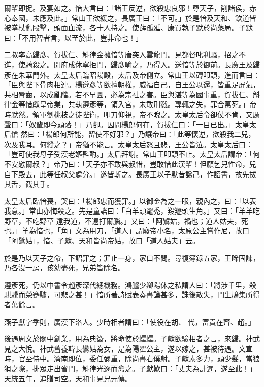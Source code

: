 \begin{pinyinscope}
 爾輩即捉。及宴如之。愔大言曰：「諸王反逆，欲殺忠良邪！尊天子，削諸侯，赤心奉國，未應及此。」常山王欲緩之，長廣王曰：「不可。」於是愔及天和、欽道皆被拳杖亂毆擊，頭面血流，各十人持之。使薛孤延、康買執子默於尚藥局。子默曰：「不用智者言，以至於此，豈非命也！」



 二叔率高歸彥、賀拔仁、斛律金擁愔等唐突入雲龍門。見都督叱利騷，招之不
 進，使騎殺之。開府成休寧拒門，歸彥喻之，乃得入。送愔等於御前。長廣王及歸彥在朱華門外。太皇太后臨昭陽殿，太后及帝側立。常山王以磚叩頭，進而言曰：「臣與陛下骨肉相連。楊遵彥等欲擅朝權，威福自己，自王公以還，皆重足屏氣，共相脣齒，以成亂階。若不早圖，必為宗社之害。臣與湛等為國事重，賀拔仁、斛律金等惜獻皇帝業，共執遵彥等，領入宮，未敢刑戮。專輒之失，罪合萬死。」帝時默然。領軍劉桃枝之徒陛衛，叩刀仰視，帝不睨之。太皇太后令卻仗不肯，又厲聲曰：「奴輩即今頭落！」乃卻。因問楊郎何在，賀拔仁曰：「一目已出。」太皇太后愴
 然曰：「楊郎何所能，留使不好邪？」乃讓帝曰：「此等懷逆，欲殺我二兒，次及我耳。何縱之？」帝猶不能言。太皇太后怒且悲，王公皆泣。太皇太后曰：「豈可使我母子受漢老嫗斟酌。」太后拜謝。常山王叩頭不止。太皇太后謂帝：「何不安慰爾叔？」帝乃曰：「天子亦不敢與叔惜，豈敢惜此漢輩！但願乞兒性命，兒自下殿去，此等任叔父處分。」遂皆斬之。長廣王以子默昔讒己，作詔書，故先拔其舌，截其手。



 太皇太后臨愔喪，哭曰：「楊郎忠而獲罪。」以御金為之一眼，親內之，曰：「以表我意。」常山亦悔殺之。先是童謠曰：「白羊頭毣禿，羖䍽頭生角。」又曰：「羊羊吃野草，不吃野草
 遠我道，不遠打爾腦。」又曰：「阿鷿姑，禍也；道人姑夫，死也。」羊為愔也，「角」文為用刀，「道人」謂廢帝小名，太原公主嘗作尼，故曰「阿鷿姑」，愔、子獻、天和皆尚帝姑，故曰「道人姑夫」云。



 於是乃以天子之命，下詔罪之；罪止一身，家口不問。尋復簿錄五家，王晞固諫，乃各沒一房，孩幼盡死，兄弟皆除名。



 遵彥死，仍以中書令趙彥深代總機務。鴻臚少卿陽休之私謂人曰：「將涉千里，殺騏驥而榮蹇驢，可悲之甚！」愔所著詩賦表奏書論甚多，誅後散失，門生鳩集所得者萬餘言。



 燕子獻字季則，廣漢下洛人。少時相者謂曰：「使役在胡、
 代，富貴在齊、趙。」



 後遇周文於關中創業，用為典簽，將命使於蠕蠕。子獻欲驗相者之言，來歸。神武見之大悅。神武舊養韓長鸞姑為女，是為陽翟公主，遂以嫁之，甚被待遇。文宣時，官至侍中。濟南即位，委任彌重，除尚書右僕射。子獻素多力，頭少髮，當狼狽之際，排眾走出省門，斛律光逐而禽之。子獻歎曰：「丈夫為計遲，遂至此！」天統五年，追贈司空。天和事見兄元傳。




\end{pinyinscope}
